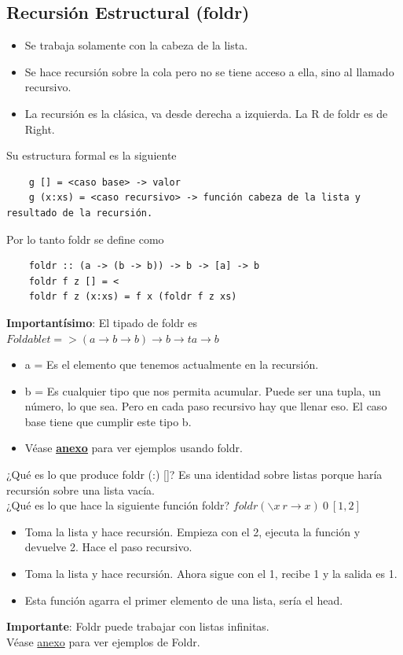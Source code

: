 \documentclass[10pt,a4paper]{article}
\begin{document}
\subsection*{Recursión Estructural (foldr)}
\begin{itemize}
    \item Se trabaja solamente con la cabeza de la lista.
    \item Se hace recursión sobre la cola pero no se tiene acceso a ella, sino al llamado recursivo. 
    \item La recursión es la clásica, va desde derecha a izquierda. La R de foldr es de Right. 
\end{itemize}
Su estructura formal es la siguiente 
\begin{lstlisting}
    g [] = <caso base> -> valor 
    g (x:xs) = <caso recursivo> -> función cabeza de la lista y resultado de la recursión.
\end{lstlisting}
Por lo tanto foldr se define como
\begin{lstlisting}
    foldr :: (a -> (b -> b)) -> b -> [a] -> b 
    foldr f z [] = <
    foldr f z (x:xs) = f x (foldr f z xs)
\end{lstlisting}
\textbf{Importantísimo}: El tipado de foldr es $ Foldable t => (a \rightarrow b \rightarrow b) \rightarrow b \rightarrow t a \rightarrow b $
\begin{itemize}
    \item a = Es el elemento que tenemos actualmente en la recursión.
    \item b = Es cualquier tipo que nos permita acumular. Puede ser una tupla, un número, lo que sea. Pero en cada paso recursivo hay que llenar eso. El caso base tiene que cumplir este tipo b.
    \item Véase \hyperref[subsec:foldr_ejercicios]{\underline{\textbf{anexo}}} para ver ejemplos usando foldr.
\end{itemize}
¿Qué es lo que produce foldr (:) []? Es una identidad sobre listas porque haría recursión sobre una lista vacía. \\
¿Qué es lo que hace la siguiente función foldr? $ foldr(\backslash x \ r \rightarrow x) \ 0 \ [1, 2]$ 
\begin{itemize}
    \item Toma la lista y hace recursión. Empieza con el 2, ejecuta la función y devuelve 2. Hace el paso recursivo.
    \item Toma la lista y hace recursión. Ahora sigue con el 1, recibe 1 y la salida es 1. 
    \item Esta función agarra el primer elemento de una lista, sería el head.
\end{itemize}
\textbf{Importante}: Foldr puede trabajar con listas infinitas. \\
Véase \hyperref[subsec:folder_ex]{anexo} para ver ejemplos de Foldr. 
\end{document}
